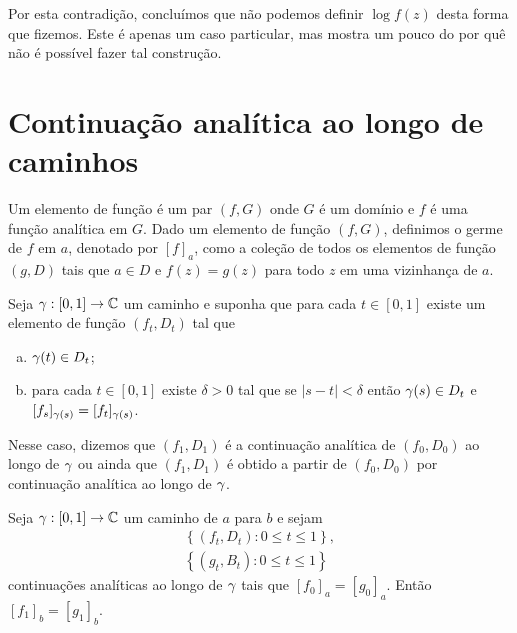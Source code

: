     Por esta contradição, concluímos que não podemos definir $\log f(z)$ desta forma que fizemos.
    Este é apenas um caso particular, mas mostra um pouco do por quê não é possível fazer tal
    construção.

\section{Continuação analítica ao longo de caminhos}


    \begin{definicao}
        \label{def-elemento-funcao}
        Um elemento de função é um par $(f, G)$ onde $G$ é um domínio e $f$
        é uma função analítica em $G$. Dado um elemento de função $(f,G)$, 
        definimos o germe de $f$ em $a$, denotado por $[f]_a$, 
        como a coleção de todos os elementos de função $(g,D)$ tais que 
        $a\in D$ e $f(z) = g(z)$ para todo $z$ em uma vizinhança de $a$.
    \end{definicao}


    \begin{definicao}
    \label{def-continuacao-analitica}
        Seja $\gamma: [0,1] \to \mathbb{C}$ um caminho e suponha que para cada
        $t\in[0,1]$ existe um elemento de função $(f_t, D_t)$ tal que
        \begin{enumerate}[(a)]
            \item $\gamma(t) \in D_t$;
            \item para cada $t\in[0,1]$ existe $\delta > 0$ tal que se $|s-t| < \delta$
            então $\gamma(s) \in D_t$ e $[f_s]_{\gamma(s)} = [f_t]_{\gamma(s)}$.
        \end{enumerate}
        Nesse caso, dizemos que $(f_1, D_1)$ é a continuação analítica de $(f_0,D_0)$ ao 
        longo de $\gamma$ ou ainda que $(f_1, D_1)$ é obtido a partir de $(f_0,D_0)$ por
        continuação analítica ao longo de $\gamma$.
    \end{definicao}


    \begin{proposicao}
    \label{prop-unicidade-continuacao-analitica-caminho}
        Seja $\gamma: [0,1]\to\mathbb{C}$ um caminho de $a$ para $b$ e sejam
        \begin{align*}
            \left\{ (f_t, D_t): 0\leq t\leq 1 \right\}, \\
            \left\{ (g_t, B_t): 0\leq t\leq 1 \right\}
        \end{align*}
        continuações analíticas ao longo de $\gamma$ tais que $[f_0]_a = [g_0]_a$.
        Então $[f_1]_b = [g_1]_b$.
    \end{proposicao}

